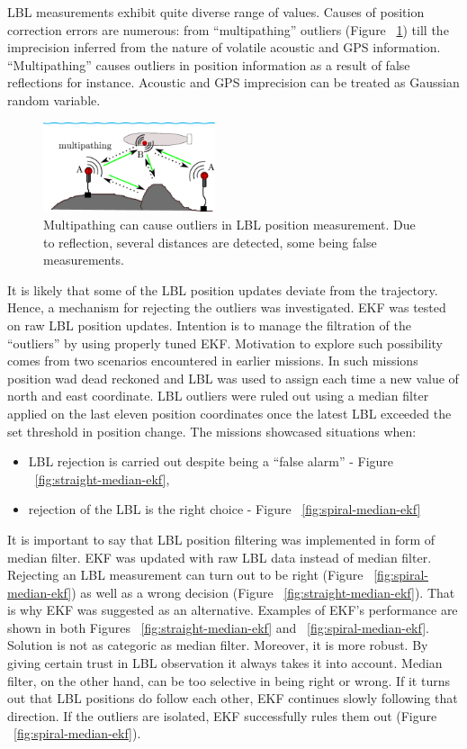 LBL measurements exhibit quite diverse range of values. Causes of position correction errors are numerous: from ``multipathing'' outliers (Figure ~\ref{fig:multipathing}) till the imprecision inferred from the nature of volatile acoustic and GPS information. ``Multipathing'' causes outliers in position information as a result of false reflections for instance. Acoustic and GPS imprecision can be treated as Gaussian random variable. 

\begin{figure}
\vspace{-10pt}
  \centering
    \includegraphics[width=0.45\textwidth]{results/fig/multipathing.eps}
  \caption{Multipathing can cause outliers in LBL position measurement. Due to reflection, several distances are detected, some  being false measurements.}
\label{fig:multipathing}
\end{figure}
It is likely that some of the LBL position updates deviate from the trajectory. Hence, a mechanism for rejecting the outliers was investigated. EKF was tested on raw LBL position updates. Intention is to manage the filtration of the ``outliers'' by using properly tuned EKF. Motivation to explore such possibility comes from two scenarios encountered in earlier missions. In such missions position wad dead reckoned and LBL was used to assign each time a new value of north and east coordinate. LBL outliers were ruled out using a median filter applied on the last eleven position coordinates once the latest LBL exceeded the set threshold in position change. The missions showcased situations when: 
\begin{itemize}
\item LBL rejection is carried out despite being a ``false alarm'' - Figure ~\ref{fig:straight-median-ekf},
\item rejection of the LBL is the right choice - Figure ~\ref{fig:spiral-median-ekf}
\end{itemize}
It is important to say that LBL position filtering was implemented in form of median filter. EKF was updated with raw LBL data instead of median filter. Rejecting an LBL measurement can turn out to be right (Figure ~\ref{fig:spiral-median-ekf}) as well as a wrong decision (Figure ~\ref{fig:straight-median-ekf}). That is why EKF was suggested as an alternative. Examples of EKF's performance are shown in both Figures ~\ref{fig:straight-median-ekf} and ~\ref{fig:spiral-median-ekf}. Solution is not as categoric as median filter. Moreover, it is more robust. By giving certain trust in LBL observation it always takes it into account. Median filter, on the other hand, can be too selective in being right or wrong. If it turns out that LBL positions do follow each other, EKF continues slowly following that direction. If the outliers are isolated, EKF successfully rules them out (Figure ~\ref{fig:spiral-median-ekf}). 
